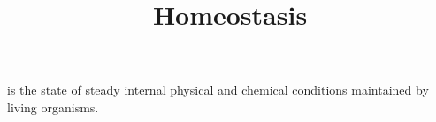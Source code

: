 \documentclass[a4paper]{article}
\title{Homeostasis}
\date{}
\begin{document}
\maketitle
    
    is the state of steady internal physical and chemical conditions maintained by living organisms.
    
    
\end{document}
